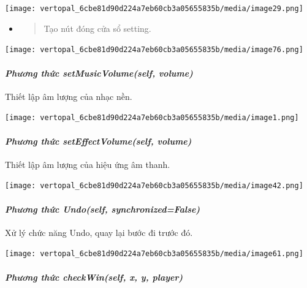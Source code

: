 \documentclass[a4paper]{article}
\begin{document}
\texttt{[image: vertopal\_6cbe81d90d224a7eb60cb3a05655835b/media/image29.png]}

\begin{itemize}
\item
  \begin{quote}
  Tạo nút đóng cửa sổ setting.
  \end{quote}
\end{itemize}

\texttt{[image: vertopal\_6cbe81d90d224a7eb60cb3a05655835b/media/image76.png]}

\hypertarget{phux1b0ux1a1ng-thux1ee9c-setmusicvolumeself-volume}{%
\paragraph{\texorpdfstring{\emph{Phương thức setMusicVolume(self,
volume)}}{Phương thức setMusicVolume(self, volume)}}\label{phux1b0ux1a1ng-thux1ee9c-setmusicvolumeself-volume}}

Thiết lập âm lượng của nhạc nền.

\texttt{[image: vertopal\_6cbe81d90d224a7eb60cb3a05655835b/media/image1.png]}

\hypertarget{phux1b0ux1a1ng-thux1ee9c-seteffectvolumeself-volume}{%
\paragraph{\texorpdfstring{\emph{Phương thức setEffectVolume(self,
volume)}}{Phương thức setEffectVolume(self, volume)}}\label{phux1b0ux1a1ng-thux1ee9c-seteffectvolumeself-volume}}

Thiết lập âm lượng của hiệu ứng âm thanh.

\texttt{[image: vertopal\_6cbe81d90d224a7eb60cb3a05655835b/media/image42.png]}

\hypertarget{phux1b0ux1a1ng-thux1ee9c-undoself-synchronizedfalse}{%
\paragraph{\texorpdfstring{\emph{Phương thức Undo(self,
synchronized=False)}}{Phương thức Undo(self, synchronized=False)}}\label{phux1b0ux1a1ng-thux1ee9c-undoself-synchronizedfalse}}

Xử lý chức năng Undo, quay lại bước đi trước đó.

\texttt{[image: vertopal\_6cbe81d90d224a7eb60cb3a05655835b/media/image61.png]}

\hypertarget{phux1b0ux1a1ng-thux1ee9c-checkwinself-x-y-player}{%
\paragraph{\texorpdfstring{\emph{Phương thức checkWin(self, x, y,
player)}}{Phương thức checkWin(self, x, y, player)}}\label{phux1b0ux1a1ng-thux1ee9c-checkwinself-x-y-player}}
\end{document}
